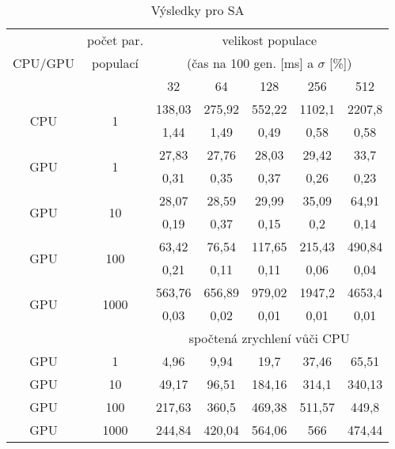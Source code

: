 \begin{table}[b]
    \begin{center}
    \begin{tabular}{ccccccc}
      \toprule
      \midrule
      \multirow{3}{*}{CPU/GPU} & počet par. & \multicolumn{5}{c}{velikost populace} \\
      & populací & \multicolumn{5}{c}{(čas na 100 gen. [ms] a $\sigma$ [\%])} \\
      & & 32 & 64 & 128 & 256 & 512 \\
      \midrule
      \multirow{2}{*}{CPU} & \multirow{2}{*}{1}
&138,03&275,92&552,22&1102,1&2207,8\\
&&1,44&1,49&0,49&0,58&0,58\vspace{1.5mm}\\
\multirow{2}{*}{GPU} & \multirow{2}{*}{1}
&27,83&27,76&28,03&29,42&33,7\\
&&0,31&0,35&0,37&0,26&0,23\vspace{1.5mm}\\
\multirow{2}{*}{GPU} & \multirow{2}{*}{10}
&28,07&28,59&29,99&35,09&64,91\\
&&0,19&0,37&0,15&0,2&0,14\vspace{1.5mm}\\
\multirow{2}{*}{GPU} & \multirow{2}{*}{100}
&63,42&76,54&117,65&215,43&490,84\\
&&0,21&0,11&0,11&0,06&0,04\vspace{1.5mm}\\
\multirow{2}{*}{GPU} & \multirow{2}{*}{1000}
&563,76&656,89&979,02&1947,2&4653,4\\
&&0,03&0,02&0,01&0,01&0,01\\
\midrule
      & & \multicolumn{5}{c}{spočtená zrychlení vůči CPU} \\
\midrule
      GPU & 1
&4,96&9,94&19,7&37,46&65,51\\
GPU & 10
&49,17&96,51&184,16&314,1&340,13\\
GPU & 100
&217,63&360,5&469,38&511,57&449,8\\
GPU & 1000
&244,84&420,04&564,06&566&474,44\\
\midrule
      \bottomrule
    \end{tabular}
    \caption{Výsledky pro SA}
    \end{center}
\end{table}


